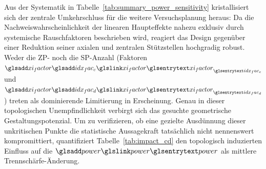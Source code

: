Aus der Systematik in Tabelle~\ref{tab:summary_power_sensitivity} kristallisiert sich der zentrale Umkehrschluss für die weitere Versuchsplanung heraus: Da die Nachweiswahrscheinlichkeit der linearen Haupteffekte nahezu exklusiv durch systemische Rauschfaktoren beschrieben wird, reagiert das Design gegenüber einer Reduktion seiner axialen und zentralen Stützstellen hochgradig robust.
Weder die \ac{ZP}- noch die \ac{SP}-Anzahl (Faktoren $\symsub{xi_factor}{idx_fac_c}$ und $\symsub{xi_factor}{idx_fac_d}$) treten als dominierende Limitierung in Erscheinung.
Genau in dieser topologischen Unempfindlichkeit verbirgt sich das gesuchte geometrische Gestaltungspotenzial.
Um zu verifizieren, ob eine gezielte Ausdünnung dieser unkritischen Punkte die statistische Aussagekraft tatsächlich nicht nennenswert kompromittiert, quantifiziert Tabelle~\ref{tab:impact_cd} den topologisch induzierten Einfluss auf die $\sym{power}$ als mittlere Trennschärfe-Änderung.
